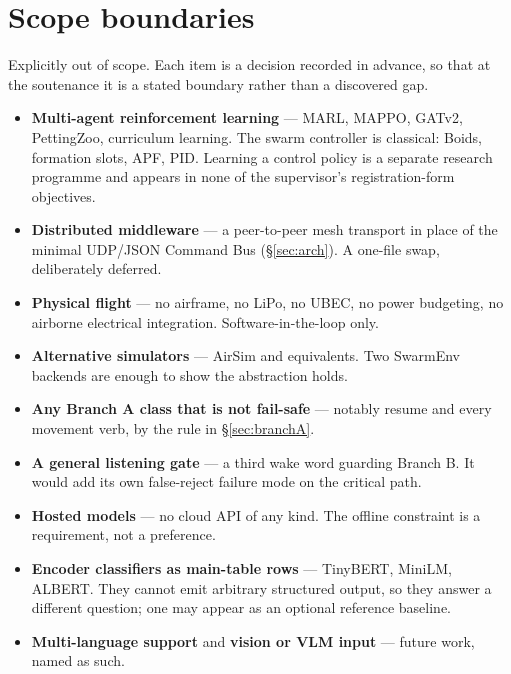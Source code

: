 \documentclass[11pt,a4paper]{article}
\newcommand{\code}[1]{{\ttfamily\small #1}}
\begin{document}
\section{Scope boundaries}
\label{sec:scope}

Explicitly out of scope. Each item is a decision recorded in advance, so that at the soutenance it is a
stated boundary rather than a discovered gap.

\begin{itemize}[leftmargin=1.6em,itemsep=3pt]
  \item \textbf{Multi-agent reinforcement learning} --- MARL, MAPPO, GATv2, PettingZoo, curriculum
        learning. The swarm controller is classical: Boids, formation slots, APF, PID. Learning a control
        policy is a separate research programme and appears in none of the supervisor's registration-form
        objectives.
  \item \textbf{Distributed middleware} --- a peer-to-peer mesh transport in place of the minimal UDP/JSON
        Command Bus (\S\ref{sec:arch}). A one-file swap, deliberately deferred.
  \item \textbf{Physical flight} --- no airframe, no LiPo, no UBEC, no power budgeting, no airborne
        electrical integration. Software-in-the-loop only.
  \item \textbf{Alternative simulators} --- AirSim and equivalents. Two \code{SwarmEnv} backends are
        enough to show the abstraction holds.
  \item \textbf{Any Branch A class that is not fail-safe} --- notably \code{resume} and every movement
        verb, by the rule in \S\ref{sec:branchA}.
  \item \textbf{A general listening gate} --- a third wake word guarding Branch B. It would add its own
        false-reject failure mode on the critical path.
  \item \textbf{Hosted models} --- no cloud API of any kind. The offline constraint is a requirement, not
        a preference.
  \item \textbf{Encoder classifiers as main-table rows} --- TinyBERT, MiniLM, ALBERT. They cannot emit
        arbitrary structured output, so they answer a different question; one may appear as an optional
        reference baseline.
  \item \textbf{Multi-language support} and \textbf{vision or VLM input} --- future work, named as such.
\end{itemize}
\end{document}
